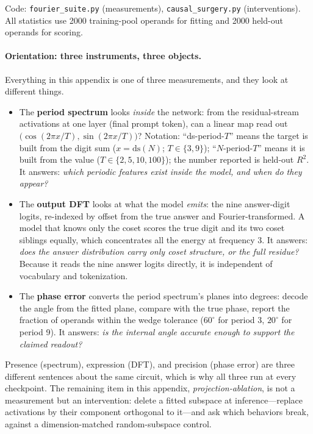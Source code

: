 \documentclass{article} %
\begin{document}
Code: \texttt{fourier\_suite.py} (measurements), \texttt{causal\_surgery.py} (interventions). All statistics use 2000 training-pool operands for fitting and 2000 held-out operands for scoring.

\paragraph{Orientation: three instruments, three objects.} Everything in this appendix is one of three measurements, and they look at different things.
\begin{itemize}
\item The \textbf{period spectrum} looks \emph{inside} the network: from the residual-stream activations at one layer (final prompt token), can a linear map read out $\big(\cos(2\pi x/T), \sin(2\pi x/T)\big)$? Notation: ``ds-period-$T$'' means the target is built from the digit sum ($x = \mathrm{ds}(N)$; $T \in \{3,9\}$); ``$N$-period-$T$'' means it is built from the value ($T \in \{2,5,10,100\}$); the number reported is held-out $R^2$. It answers: \emph{which periodic features exist inside the model, and when do they appear?}
\item The \textbf{output DFT} looks at what the model \emph{emits}: the nine answer-digit logits, re-indexed by offset from the true answer and Fourier-transformed. A model that knows only the coset scores the true digit and its two coset siblings equally, which concentrates all the energy at frequency 3. It answers: \emph{does the answer distribution carry only coset structure, or the full residue?} Because it reads the nine answer logits directly, it is independent of vocabulary and tokenization.
\item The \textbf{phase error} converts the period spectrum's planes into degrees: decode the angle from the fitted plane, compare with the true phase, report the fraction of operands within the wedge tolerance ($60^\circ$ for period 3, $20^\circ$ for period 9). It answers: \emph{is the internal angle accurate enough to support the claimed readout?}
\end{itemize}
Presence (spectrum), expression (DFT), and precision (phase error) are three different sentences about the same circuit, which is why all three run at every checkpoint. The remaining item in this appendix, \emph{projection-ablation}, is not a measurement but an intervention: delete a fitted subspace at inference---replace activations by their component orthogonal to it---and ask which behaviors break, against a dimension-matched random-subspace control.
\end{document}
